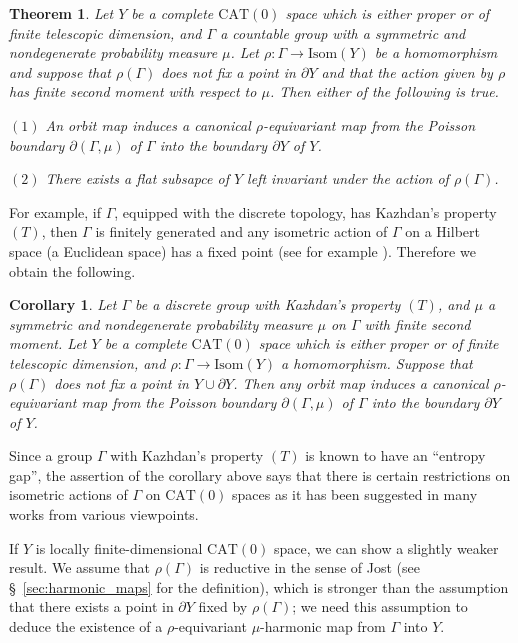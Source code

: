 \documentclass[12pt]{amsart}
\numberwithin{equation}{section}
\theoremstyle{plain}
\newtheorem{Main}{Theorem}
\newtheorem*{Cor}{Corollary}
\theoremstyle{definition}
\theoremstyle{remark}
\newcommand{\isom}[1]{\mathrm{Isom}({#1})}
\newcommand{\cat}[1]{\mathrm{CAT}(#1)}
\begin{document}
\begin{Main}
\label{thm:main-2}
 Let $Y$ be a complete $\cat{0}$ space which is either proper or
 of finite telescopic dimension, and $\Gamma$ a countable group
 with a symmetric and nondegenerate probability measure $\mu$.
 Let $\rho\colon \Gamma \rightarrow \isom{Y}$ be a homomorphism and 
 suppose that $\rho(\Gamma)$ does not fix a point in 
 $\partial Y$ and that the action given by $\rho$ has finite
 second moment with respect to $\mu$.
 Then either of the following is true. 

  $(1)$ An orbit map induces a canonical $\rho$-equivariant map from the
 Poisson boundary $\partial (\Gamma,\mu)$ of $\Gamma$ into the boundary
 $\partial Y$ of $Y$. 

 $(2)$ There exists a flat subsapce of $Y$ left invariant under the
 action of $\rho(\Gamma)$. 
\end{Main}

 For example, if $\Gamma$, equipped with the discrete topology,
 has Kazhdan's property $(T)$, then 
 $\Gamma$ is finitely generated and any
 isometric action of $\Gamma$ on a Hilbert space (a Euclidean space) has
 a fixed point (see for example \cite{bekka-delaharpe-valette}). 
 Therefore we obtain the following. 

\begin{Cor} Let $\Gamma$ be a discrete group with Kazhdan's
 property $(T)$, and $\mu$ a symmetric and nondegenerate probability
 measure $\mu$ on $\Gamma$ with finite second moment. 
 Let $Y$ be a complete $\cat{0}$ space which is either proper or
 of finite telescopic dimension, and 
 $\rho\colon \Gamma \rightarrow \isom{Y}$ a homomorphism. 
 Suppose that $\rho(\Gamma)$ does not fix a point in $Y\cup \partial Y$.
 Then any orbit map induces a canonical $\rho$-equivariant map from the
 Poisson boundary $\partial (\Gamma,\mu)$ of $\Gamma$ into the boundary
 $\partial Y$ of $Y$. 
\end{Cor}

Since a group $\Gamma$ with Kazhdan's property $(T)$ is known to
have an ``entropy gap'', the assertion of the corollary above says that 
there is certain restrictions on isometric actions of $\Gamma$ on
$\cat{0}$ spaces as it has been suggested in many works from various
viewpoints. 


If $Y$ is locally finite-dimensional $\cat{0}$ space, we can show a
slightly weaker result. 
We assume that $\rho(\Gamma)$ is 
reductive in the sense of Jost
(see \S~\ref{sec:harmonic_maps} for the definition), which is stronger
than the assumption that there exists a point in $\partial Y$ fixed by
$\rho(\Gamma)$; we need this assumption to deduce the existence of a
$\rho$-equivariant $\mu$-harmonic map from $\Gamma$ into $Y$. 
\end{document}
